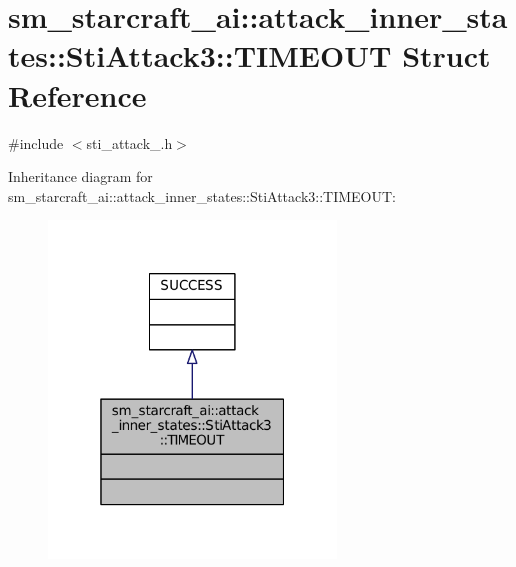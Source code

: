 \hypertarget{structsm__starcraft__ai_1_1attack__inner__states_1_1StiAttack3_1_1TIMEOUT}{}\section{sm\+\_\+starcraft\+\_\+ai\+:\+:attack\+\_\+inner\+\_\+states\+:\+:Sti\+Attack3\+:\+:T\+I\+M\+E\+O\+UT Struct Reference}
\label{structsm__starcraft__ai_1_1attack__inner__states_1_1StiAttack3_1_1TIMEOUT}


{\ttfamily \#include $<$sti\+\_\+attack\+\_.\+h$>$}



Inheritance diagram for sm\+\_\+starcraft\+\_\+ai\+:\+:attack\+\_\+inner\+\_\+states\+:\+:Sti\+Attack3\+:\+:T\+I\+M\+E\+O\+UT\+:
\nopagebreak
\begin{figure}[H]
\begin{center}
\leavevmode
\includegraphics[width=217pt]{structsm__starcraft__ai_1_1attack__inner__states_1_1StiAttack3_1_1TIMEOUT__inherit__graph}
\end{center}
\end{figure}


